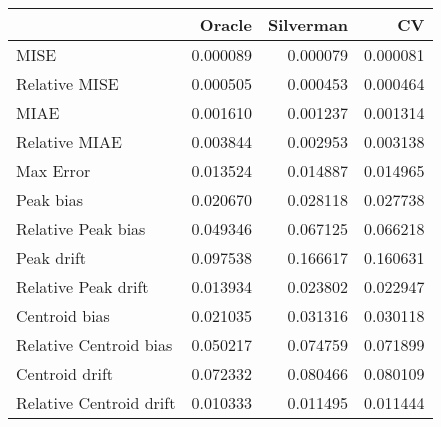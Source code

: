 \begin{tabular}{lrrr}
  \hline
 & Oracle & Silverman & CV \\ 
  \hline
MISE & 0.000089 & 0.000079 & 0.000081 \\ 
  Relative MISE & 0.000505 & 0.000453 & 0.000464 \\ 
  MIAE & 0.001610 & 0.001237 & 0.001314 \\ 
  Relative MIAE & 0.003844 & 0.002953 & 0.003138 \\ 
  Max Error & 0.013524 & 0.014887 & 0.014965 \\ 
  Peak bias & 0.020670 & 0.028118 & 0.027738 \\ 
  Relative Peak bias & 0.049346 & 0.067125 & 0.066218 \\ 
  Peak drift & 0.097538 & 0.166617 & 0.160631 \\ 
  Relative Peak drift & 0.013934 & 0.023802 & 0.022947 \\ 
  Centroid bias & 0.021035 & 0.031316 & 0.030118 \\ 
  Relative Centroid bias & 0.050217 & 0.074759 & 0.071899 \\ 
  Centroid drift & 0.072332 & 0.080466 & 0.080109 \\ 
  Relative Centroid drift & 0.010333 & 0.011495 & 0.011444 \\ 
   \hline
\end{tabular}
